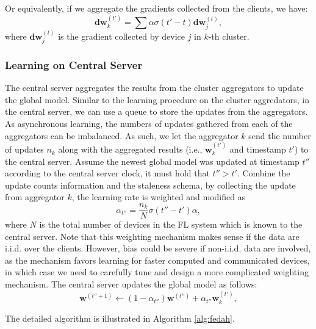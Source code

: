 \documentclass[10pt,twocolumn,letterpaper]{article}
\theoremstyle{definition}
\begin{document}
Or equivalently, if we aggregate the gradients collected from the clients, we have:
\[ \mathbf{dw}_k^{(t')} = \sum \alpha \sigma(t'-t) \mathbf{dw}_j^{(t)}, \]
where $\mathbf{dw}_j^{(t)} $ is the gradient collected by device $j$ in $k$-th cluster. 

\subsubsection{Learning on Central Server}
The central server aggregates the results from the cluster aggregators to update the global model. Similar to the learning procedure on the cluster aggredators, in the central server, we can use a queue to store the updates from the aggregators. As asynchronous learning, the numbers of updates gathered from each of the aggregators can be imbalanced. As such, we let the aggregator $k$ send the number of updates $n_k$ along with the aggregated results (i.e., $\mathbf{w}_k^{(t')}$ and timestamp $t'$) to the central server. Assume the newest global model was updated at timestamp $t''$ according to the central server clock, it must hold that $t'' > t'$. Combine the update counts information and the staleness schema, by collecting the update from aggregator $k$, the learning rate is weighted and modified as $$\alpha_{t''} = \dfrac{n_k}{N} \sigma(t''-t') \alpha, $$
where $N$ is the total number of devices in the FL system which is known to the central server. 
Note that this weighting mechanism makes sense if the data are i.i.d. over the clients. However, bias could be severe if non-i.i.d. data are involved, as the mechanism favors learning for faster computed and communicated devices, in which case we need to carefully tune and design a more complicated weighting mechanism. The central server updates the global model as follows:
\[
    \mathbf{w}^{(t''+1)}  \leftarrow (1-\alpha_{t''}) \mathbf{w}^{(t'')} + \alpha_{t''} \mathbf{w}^{(t')}_{k},
\]

The detailed algorithm is illustrated in Algorithm \ref{alg:fedah}.
\end{document}
